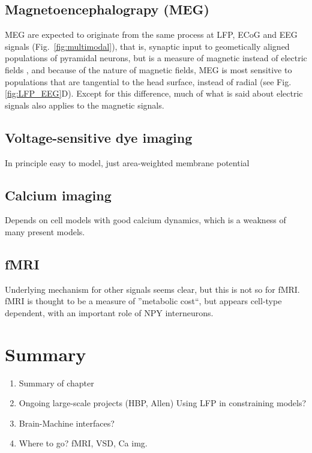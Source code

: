 \documentclass[preprint,11pt,authoryear]{elsarticle}
\begin{document}
\subsection*{Magnetoencephalograpy (MEG)}
MEG are expected to originate from the same process at LFP, ECoG and EEG signals (Fig.~\ref{fig:multimodal}), that is, synaptic input
to geometically aligned populations of pyramidal neurons, but
is a measure of magnetic instead of electric fields \citep{Hamalainen1993}, and because of the nature of magnetic fields, MEG is most sensitive to populations that are tangential to the head surface, instead of radial (see Fig. \ref{fig:LFP_EEG}D). Except for this difference, much of what is said about electric signals also applies to the magnetic signals.
\subsection*{Voltage-sensitive dye imaging}
In principle easy to model, just area-weighted membrane potential
\subsection*{Calcium imaging}
Depends on cell models with good calcium dynamics, which is a weakness of many present models.
\subsection*{fMRI}
Underlying mechanism for other signals seems clear, but this is not so for fMRI. fMRI is thought to be a measure of ''metabolic cost``, but appears cell-type dependent, with an important role of NPY interneurons.

\section{Summary}
\label{sec:summary}
\begin{enumerate}
 \item Summary of chapter
 \item Ongoing large-scale projects (HBP, Allen)
 \subitem Using LFP in constraining models?
 \item Brain-Machine interfaces?
 \item Where to go?
 \subitem fMRI, VSD, Ca img.
\end{enumerate}



\end{document}
